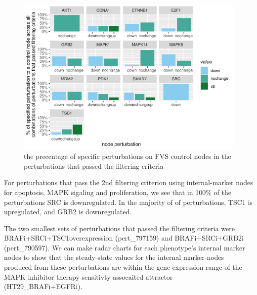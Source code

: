 \documentclass[
]{book}
\begin{document}
\begin{figure}
\centering
\includegraphics{_main_files/figure-latex/all-three-1.pdf}
\caption{\label{fig:all-three}the precentage of specific perturbations on FVS control nodes in the perturbations that passed the filtering criteria}
\end{figure}

For perturbations that pass the 2nd filtering criterion using internal-marker nodes for apoptosis, MAPK sigaling and proliferation, we see that in 100\% of the perturbations SRC is downregulated. In the majority of of perturbations, TSC1 is upregulated, and GRB2 is downregulated.

The two smallest sets of perturbations that passed the filtering criteria were BRAFi+SRCi+TSC1overexpression (pert\_797159) and BRAFi+SRCi+GRB2i (pert\_790597). We can make radar charts for each phenotype's internal marker nodes to show that the steady-state values for the internal marker-nodes produced from these perturbations are within the gene expression range of the MAPK inhibitor therapy sensitivty assocaited attractor (HT29\_BRAFi+EGFRi).
\end{document}
